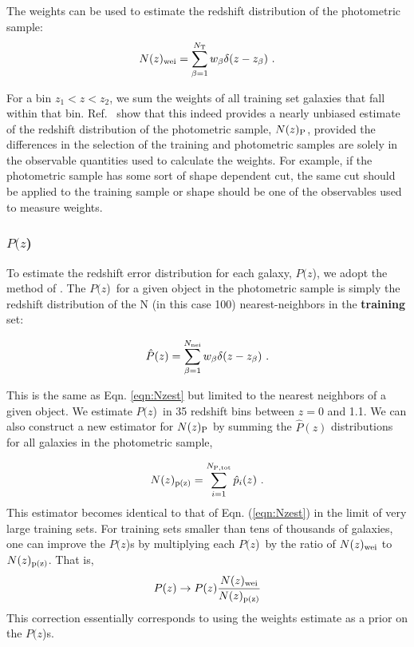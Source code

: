 \documentclass[preprint]{aastex}
\newcommand{\pofz}{$P(z$)}
\newcommand{\nwei}{N(z)_{\rm wei}}
\newcommand{\npz}{N(z)_{\rm p(z)}}
\begin{document}
The weights can be used to estimate the redshift distribution of the
photometric sample:
\begin{equation}  
\nwei = \sum_{\beta=1}^{N_{\rm T}} w_\beta \delta(z-z_\beta)~.
\label{eqn:Nzest}
\end{equation}

\noindent For a bin $z_1 < z < z_2$, we sum the weights of all training
set galaxies that fall within that bin.  
Ref.~\cite{LimaPhotoz08,CunhaPhotoz09} show that this indeed provides
a nearly unbiased estimate of the redshift distribution of the photometric
sample, $N(z)_{\rm P}$, provided the differences in the selection of the
training and photometric samples are solely in the observable quantities used
to calculate the weights.  For example, if the photometric sample
has some sort of shape dependent cut, the same cut should be applied to the
training sample or shape should be one of the observables used to measure
weights.


\subsubsection{\pofz}

To estimate the redshift error distribution for each galaxy, \pofz,
we adopt the method of \cite{CunhaPhotoz09}. The \pofz\ for a given object in the
photometric sample is simply the redshift distribution of the N (in this case
100) nearest-neighbors in the {\bf training} set:

\begin{equation}
\hat{P}(z) = \sum_{\beta=1}^{N_{\rm nei}} w_\beta \delta(z-z_\beta)~.
\label{eqn:pzest}
\end{equation}

\noindent This is the same as Eqn. \ref{eqn:Nzest} but limited to the nearest
neighbors of a given object. We estimate \pofz\ in 35 redshift bins between
$z=0$ and 1.1.  We can also construct a new estimator for $N(z)_{\rm P}$ by
summing the $\hat{P}(z)$ distributions for all galaxies in the photometric
sample,


\begin{equation}
\npz = \sum_{i=1}^{N_{\rm P,tot}}\hat{p}_i(z)~.
\label{eqn:Nhat2}
\end{equation}
\noindent This estimator becomes identical to that of Eqn. (\ref{eqn:Nzest})
in the limit of very large training sets.  For training sets smaller than tens
of thousands of galaxies, one can improve the \pofz s by multiplying each \pofz\ by the
ratio of $\nwei$ to $\npz$.
That is,
\begin{equation} \label{eq:pzcorrect}
P(z) \rightarrow P(z)\frac{\nwei}{\npz} \label{eqn:pzcorrect}
\end{equation}
This correction essentially corresponds to using the weights estimate as a
prior on the \pofz s.
\end{document}
